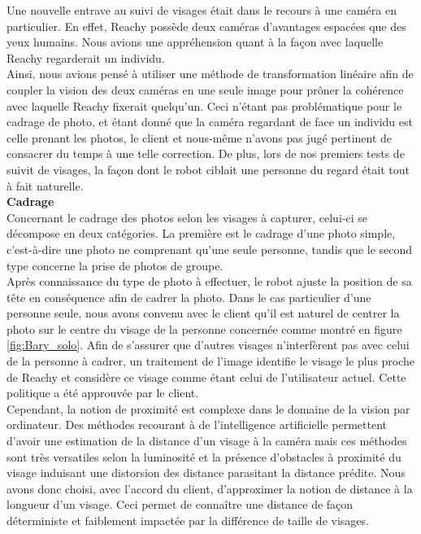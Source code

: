 \documentclass[a4paper,french]{article}
\begin{document}
Une nouvelle entrave au suivi de visages était dans le recours à une caméra en particulier. En effet, Reachy possède deux caméras d'avantages espacées que des yeux humains. Nous avions une appréhension quant à la façon avec laquelle Reachy regarderait un individu.\\
Ainsi, nous avions pensé à utiliser une méthode de transformation linéaire afin de coupler la vision des deux caméras en une seule image pour prôner la cohérence avec laquelle Reachy fixerait quelqu'un. Ceci n'étant pas problématique pour le cadrage de photo, et étant donné que la caméra regardant de face un individu est celle prenant les photos, le client et nous-même n'avons pas jugé pertinent de consacrer du temps à une telle correction. De plus, lors de nos premiers tests de suivit de visages, la façon dont le robot ciblait une personne du regard était tout à fait naturelle. \\

\textbf{Cadrage}\\

Concernant le cadrage des photos selon les visages à capturer, celui-ci se décompose en deux catégories. La première est le cadrage d'une photo simple, c'est-à-dire une photo ne comprenant qu'une seule personne, tandis que le second type concerne la prise de photos de groupe.\\

Après connaissance du type de photo à effectuer, le robot ajuste la position de sa tête en conséquence afin de cadrer la photo. Dans le cas particulier d'une personne seule, nous avons convenu avec le client qu'il est naturel de centrer la photo sur le centre du visage de la personne concernée comme montré en figure \ref{fig:Bary_solo}. Afin de s'assurer que d'autres visages n'interfèrent pas avec celui de la personne à cadrer, un traitement de l'image identifie le visage le plus proche de Reachy et considère ce visage comme étant celui de l'utilisateur actuel. Cette politique a été approuvée par le client.\\

Cependant, la notion de proximité est complexe dans le domaine de la vision par ordinateur. Des méthodes recourant à de l'intelligence artificielle permettent d'avoir une estimation de la distance d'un visage à la caméra mais ces méthodes sont très versatiles selon la luminosité et la présence d'obstacles à proximité du visage induisant une distorsion des distance parasitant la distance prédite. Nous avons donc choisi, avec l'accord du client, d'approximer la notion de distance à la longueur d'un visage. Ceci permet de connaître une distance de façon déterministe et faiblement impactée par la différence de taille de visages.
\end{document}
